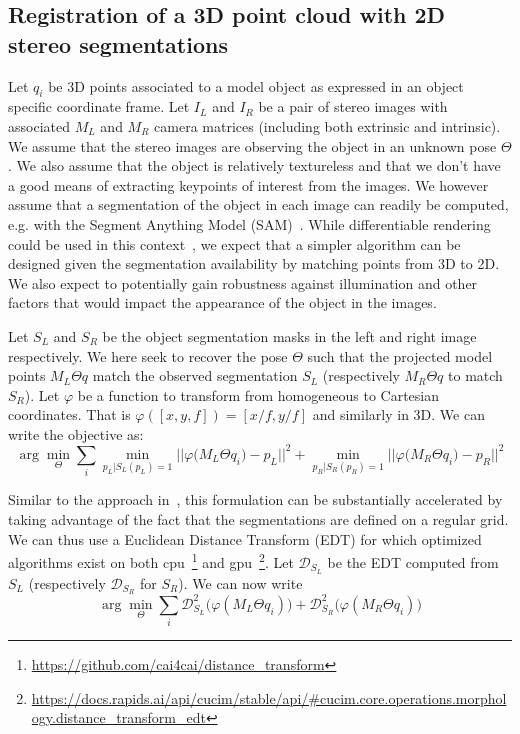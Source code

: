 \subsection{Registration of a 3D point cloud with 2D stereo segmentations}
\label{in:sec:registration_of_3d_point_cloud}
%
Let $q_i$ be 3D points associated to a model object as expressed in an object specific coordinate frame.
Let $I_L$ and $I_R$ be a pair of stereo images with associated $M_L$ and $M_R$ camera matrices (including both extrinsic and intrinsic).
We assume that the stereo images are observing the object in an unknown pose $\Theta$.
We also assume that the object is relatively textureless and that we don't have a good means of extracting keypoints of interest from the images.
We however assume that a segmentation of the object in each image can readily be computed, e.g. with the Segment Anything Model (SAM)~\cite{Kirillov:arxiv:2023}.
%
While differentiable rendering could be used in this context~\cite{Hannemose:SPIE:2019,Labbe:CVPR:2021,Chen:RAL:2023},
we expect that a simpler algorithm can be designed given the segmentation availability by matching points from 3D to 2D.
We also expect to potentially gain robustness against illumination and other factors that would impact the appearance of the object in the images.

Let $S_L$ and $S_R$ be the object segmentation masks in the left and right image respectively.
We here seek to recover the pose $\Theta$ such that the projected model points ${M_L \Theta q}$ match the observed segmentation $S_L$ (respectively ${M_R \Theta q}$ to match $S_R$).
Let $\varphi$ be a function to transform from homogeneous to Cartesian coordinates.
That is $\varphi([x,y,f])=[x/f,y/f]$ and similarly in 3D.
We can write the objective as:
\begin{equation}
\arg\min_{\Theta} \sum_i
\min_{p_L|S_L(p_L)=1}|| \varphi\big(M_L \Theta q_i\big) - p_L||^2
+ \min_{p_R|S_R(p_R)=1}|| \varphi\big(M_R \Theta q_i\big) - p_R||^2
\end{equation}

Similar to the approach in~\cite{Fitzgibbon:IVC:2003}, this formulation can be substantially accelerated by taking advantage of the fact that the segmentations are defined on a regular grid. We can thus use a Euclidean Distance Transform (EDT) for which optimized algorithms exist on both \acrfull{cpu}~\cite{Felzenszwalb:TC:2012}\footnote{\url{https://github.com/cai4cai/distance_transform}} and \acrshort{gpu}~\cite{Cao:SIGGRAPH:2010}\footnote{\url{https://docs.rapids.ai/api/cucim/stable/api/\#cucim.core.operations.morphology.distance_transform_edt}}.
Let $\mathcal{D}_{S_L}$ be the EDT computed from $S_L$ (respectively $\mathcal{D}_{S_R}$ for $S_R$).
We can now write
\begin{equation}\label{eq:dt3d2d}
\arg\min_{\Theta} \sum_i \mathcal{D}_{S_L}^2\big( \varphi(M_L \Theta q_i) \big)
+ \mathcal{D}_{S_R}^2\big( \varphi(M_R \Theta q_i) \big)
\end{equation}

